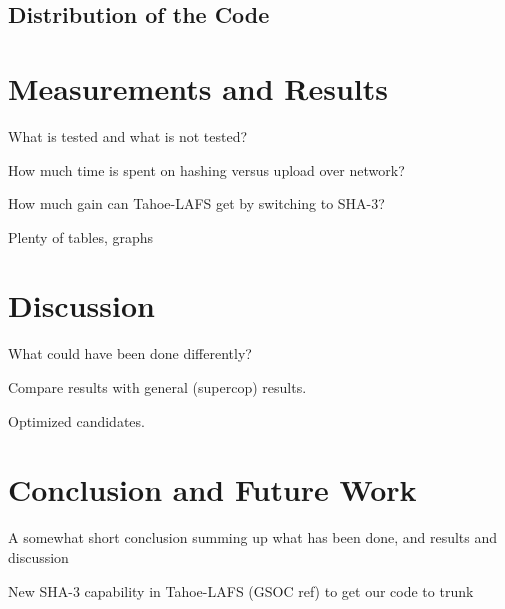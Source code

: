 \documentclass[english,12pt,a4paper]{book}
\begin{document}
\section{Distribution of the Code}

\chapter{Measurements and Results}

What is tested and what is not tested?

How much time is spent on hashing versus upload over network?

How much gain can Tahoe-LAFS get by switching to SHA-3?

Plenty of tables, graphs

\chapter{Discussion}

What could have been done differently?

Compare results with general (supercop) results.

Optimized candidates.

\chapter{Conclusion and Future Work}

A somewhat short conclusion summing up what has been done, and results and
discussion

New SHA-3 capability in Tahoe-LAFS (GSOC ref) to get our code to trunk






\end{document}
